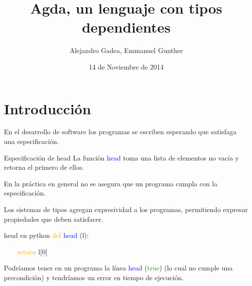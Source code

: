 \documentclass[xcolor=dvipsnames]{beamer} %
\newcommand{\cf}[1]{\textcolor{blue}{#1}}
\newcommand{\cc}[1]{\textcolor{ForestGreen}{#1}}
\newcommand{\ck}[1]{\textcolor{orange}{#1}}
\newcommand{\T}{ \ \ \ \ }
\begin{document}
\beamertemplatenavigationsymbolsempty
\title{Agda, un lenguaje con tipos dependientes}
\author{Alejandro Gadea, Emmanuel Gunther}
\date{14 de Noviembre de 2014}
\frame{\titlepage}

\section{Introducción}

\begin{frame}

\begin{block}{ }
 En el desarrollo de software los programas se escriben esperando que
 satisfaga una especificación.
\end{block}

\pause

\begin{exampleblock}{Especificación de head}
 La función \cf{head} toma una lista de elementos no vacía y retorna el primero de ellos.
\end{exampleblock}

\pause

\begin{block}{}
 En la práctica en general no se asegura que un programa cumpla con la especificación.
\end{block}


\end{frame}

\begin{frame}

\begin{block}{ }
 Los sistemas de tipos agregan expresividad a los programas, permitiendo expresar propiedades que deben satisfacer.
\end{block}

\pause

\begin{exampleblock}{head en python}
  \ck{def} \cf{head} (l):
  
  \T \ck{return} l[0]
\end{exampleblock}

\pause

\begin{block}{}
  Podríamos tener en un programa la línea \cf{head} (\cc{true}) (lo cual no cumple una precondición) 
  y tendríamos un error en tiempo de ejecución.
\end{block}

\end{frame}
\end{document}
